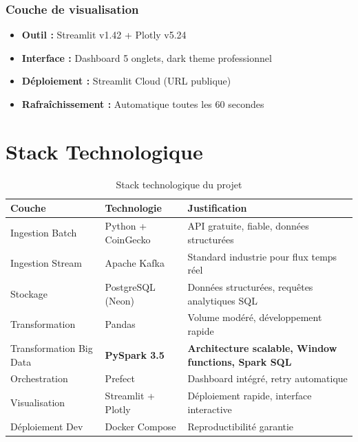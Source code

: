 \documentclass[12pt,a4paper]{article}
\begin{document}
\subsubsection{Couche de visualisation}
\begin{itemize}
    \item \textbf{Outil :} Streamlit v1.42 + Plotly v5.24
    \item \textbf{Interface :} Dashboard 5 onglets, dark theme professionnel
    \item \textbf{Déploiement :} Streamlit Cloud (URL publique)
    \item \textbf{Rafraîchissement :} Automatique toutes les 60 secondes
\end{itemize}

\section{Stack Technologique}

\begin{table}[H]
\centering
\begin{tabular}{|l|l|p{5.5cm}|}
\hline
\textbf{Couche} & \textbf{Technologie} & \textbf{Justification} \\
\hline
Ingestion Batch    & Python + CoinGecko   & API gratuite, fiable, données structurées \\
\hline
Ingestion Stream   & Apache Kafka         & Standard industrie pour flux temps réel \\
\hline
Stockage           & PostgreSQL (Neon)    & Données structurées, requêtes analytiques SQL \\
\hline
Transformation     & Pandas               & Volume modéré, développement rapide \\
\hline
\rowcolor{orange!15}
Transformation Big Data & \textbf{PySpark 3.5} & \textbf{Architecture scalable, Window functions, Spark SQL} \\
\hline
Orchestration      & Prefect              & Dashboard intégré, retry automatique \\
\hline
Visualisation      & Streamlit + Plotly   & Déploiement rapide, interface interactive \\
\hline
Déploiement Dev    & Docker Compose       & Reproductibilité garantie \\
\hline
\end{tabular}
\caption{Stack technologique du projet}
\end{table}
\end{document}
